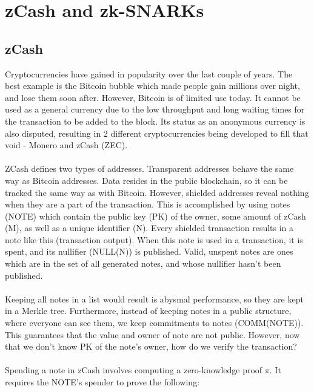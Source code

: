 
\chapter{zCash and zk-SNARKs} %

\label{Chapter3} %


\section{zCash}

Cryptocurrencies have gained in popularity over the last couple of years. The best example is the Bitcoin bubble which made people gain millions over night, and lose them soon after. However, Bitcoin is of limited use today. It cannot be used as a general currency due to the low throughput and long waiting times for the transaction to be added to the block. Its status as an anonymous currency is also disputed, resulting in 2 different cryptocurrencies being developed to fill that void - Monero and zCash (ZEC).\\
\\
ZCash defines two types of addresses. Transparent addresses behave the same way as Bitcoin addresses. Data resides in the public blockchain, so it can be tracked the same way as with Bitcoin. However, shielded addresses reveal nothing when they are a part of the transaction. This is accomplished by using notes (NOTE) which contain the public key (PK) of the owner, some amount of zCash (M), as well as a unique identifier (N). Every shielded transaction results in a note like this (transaction output). When this note is used in a transaction, it is spent, and its nullifier (NULL(N)) is published. Valid, unspent notes are ones which are in the set of all generated notes, and whose nullifier hasn't been published.\\
\\
Keeping all notes in a list would result is abysmal performance, so they are kept in a Merkle tree. Furthermore, instead of keeping notes in a public structure, where everyone can see them, we keep commitments to notes (COMM(NOTE)). This guarantees that the value and owner of note are not public. However, now that we don't know PK of the note's owner, how do we verify the transaction?\\
\\
Spending a note in zCash involves computing a zero-knowledge proof $\pi$. It requires the NOTE's spender to prove the following:

